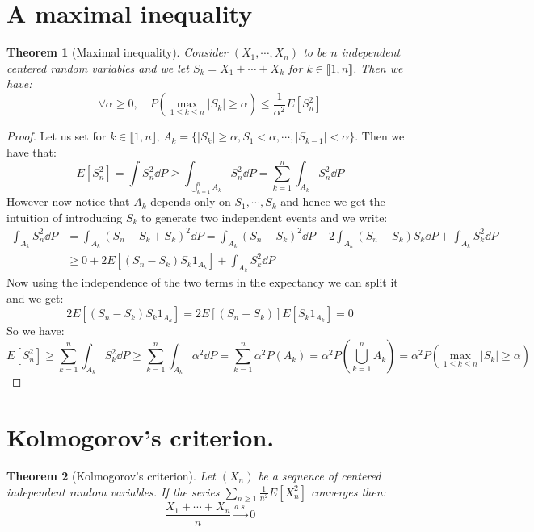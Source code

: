 \documentclass[10pt,a4paper]{book}
\newtheorem{theorem}{Theorem}[section]
\theoremstyle{definition}
\begin{document}
\section{A maximal inequality}

\begin{theorem}[Maximal inequality]

Consider $(X_1, \cdots, X_n)$ to be $n$ independent centered random variables and we let $S_k = X_1 + \cdots + X_k$ for $k \in \llbracket 1, n \rrbracket$. Then we have:
\[
\forall \alpha \geq 0, \quad P(\max_{1 \leq k \leq n} |S_k| \geq \alpha) \leq \frac{1}{\alpha^2} E[S_n^2]
\] 

\end{theorem}

\begin{proof}

Let us set for $k \in \llbracket 1, n \rrbracket$, $A_k = \{ |S_k| \geq \alpha, S_1 < \alpha, \cdots, |S_{k-1}| < \alpha\}$. Then we have that:
\[
E[S_n^2] = \int S_n^2 \dd P \geq \int_{\bigcup_{k = 1}^n A_k} S_n^2 \dd P = \sum_{k = 1}^n \int_{A_k} S_n^2 \dd P 
\]
However now notice that $A_k$ depends only on $S_1, \cdots, S_k$ and hence we get the intuition of introducing $S_k$ to generate two independent events and we write:
\begin{align*}
\int_{A_k} S_n^2 \dd P &= \int_{A_k} (S_n - S_k + S_k)^2 \dd P = \int_{A_k} (S_n - S_k)^2 \dd P + 2 \int_{A_k} (S_n - S_k) S_k \dd P + \int_{A_k} S_k^2 \dd P\\
&\geq 0 + 2 E\left[ (S_n - S_k) S_k 1_{A_k} \right] + \int_{A_k} S_k^2 \dd P 
\end{align*}
Now using the independence of the two terms in the expectancy we can split it and we get:
\[
2 E\left[ (S_n - S_k) S_k 1_{A_k} \right] = 2 E\left[ (S_n - S_k) \right]E \left[ S_k 1_{A_k} \right] = 0 
\]
So we have:
\[
E[S_n^2] \geq \sum_{k = 1}^n \int_{A_k} S_k^2 \dd P \geq \sum_{k = 1}^n \int_{A_k} \alpha^2 \dd P = \sum_{k = 1}^n \alpha^2 P(A_k) = \alpha^2 P(\bigcup_{k = 1}^n A_k) = \alpha^2 P(\max_{1 \leq k \leq n} |S_k| \geq \alpha)
\]
\end{proof}

\section{Kolmogorov's criterion.}

\begin{theorem}[Kolmogorov's criterion]
Let $(X_n)$ be a sequence of centered independent random variables. If the series $\sum_{n \geq 1} \frac{1}{n^2} E[X_n^2]$ converges then:
\[
\frac{X_1 + \cdots + X_n}{n} \stackrel{a.s.}\longrightarrow 0
\]
\end{theorem}
\end{document}
